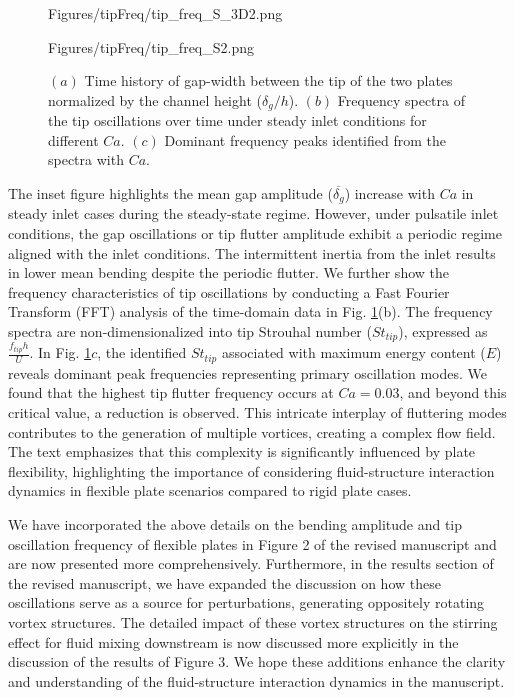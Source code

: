 \documentclass[onecolumn,a4paper,amsmath,amssym,pre]{revtex4}
\begin{document}
\begin{enumerate}
\begin{figure}[h!]
\begin{center}
\begin{minipage}[c]{0.3\linewidth}
\begin{overpic}[width=1\linewidth]{Figures/tipFreq/tip_freq_S_3D2.png}
								\end{overpic}
							\end{minipage} 
							\begin{minipage}[c]{0.3\linewidth}	
								\centering
								\begin{overpic}[width=0.97\linewidth]{Figures/tipFreq/tip_freq_S2.png} 
								\end{overpic}
							\end{minipage} 
						\end{center}
						\vspace{-10px}
						\caption{$(a)$ Time history of gap-width between the tip of the two plates normalized by the channel height ($\delta_g/h$). $(b)$ Frequency spectra of the tip oscillations over time under steady inlet conditions for different $Ca$. $(c)$ Dominant frequency peaks identified from the spectra with $Ca$. }
						\label{fig:del_g_vs_Ca_steady}
					\end{figure}
					The inset figure highlights the mean gap amplitude ($\overline{\delta_g}$) increase with $Ca$ in steady inlet cases during the steady-state regime. However, under pulsatile inlet conditions, the gap oscillations or tip flutter amplitude exhibit a periodic regime aligned with the inlet conditions. The intermittent inertia from the inlet results in lower mean bending despite the periodic flutter. We further show the frequency characteristics of tip oscillations by conducting a Fast Fourier Transform (FFT) analysis of the time-domain data in Fig. \ref{fig:del_g_vs_Ca_steady}(b). The frequency spectra are non-dimensionalized into tip Strouhal number ($St_{tip}$), expressed as $\frac{f_{tip}h}{U}$. In Fig. \ref{fig:del_g_vs_Ca_steady}$c$, the identified $St_{tip}$ associated with maximum energy content ($E$) reveals dominant peak frequencies representing primary oscillation modes. We found that the highest tip flutter frequency occurs at $Ca=0.03$, and beyond this critical value, a reduction is observed. This intricate interplay of fluttering modes contributes to the generation of multiple vortices, creating a complex flow field. The text emphasizes that this complexity is significantly influenced by plate flexibility, highlighting the importance of considering fluid-structure interaction dynamics in flexible plate scenarios compared to rigid plate cases.
					
					
					We have incorporated the above details on the bending amplitude and tip oscillation frequency of flexible plates in Figure 2 of the revised manuscript and are now presented more comprehensively. Furthermore, in the results section of the revised manuscript, we have expanded the discussion on how these oscillations serve as a source for perturbations, generating oppositely rotating vortex structures. The detailed impact of these vortex structures on the stirring effect for fluid mixing downstream is now discussed more explicitly in the discussion of the results of Figure 3. We hope these additions enhance the clarity and understanding of the fluid-structure interaction dynamics in the manuscript. 
					

\end{enumerate}
\end{document}
